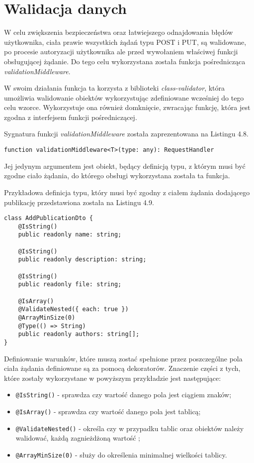 \documentclass[a4paper,12pt,twoside,openany]{report}
\begin{document}
\section{Walidacja danych}
W celu zwiększenia bezpieczeństwa oraz łatwiejszego odnajdowania błędów użytkownika, ciała prawie wszystkich żądań typu POST i PUT, są walidowane, po procesie autoryzacji użytkownika ale przed wywołaniem właściwej funkcji obsługującej żądanie. Do tego celu wykorzystana została funkcja pośrednicząca \textit{validationMiddleware}. 

W swoim działania funkcja ta korzysta z biblioteki \textit{class-validator}, która umożliwia walidowanie obiektów wykorzystując zdefiniowane wcześniej do tego celu wzorce. Wykorzystuje ona również domknięcie, zwracając funkcję, która jest zgodna z interfejsem funkcji pośredniczącej.

Sygnatura funkcji \textit{validationMiddleware} została zaprezentowana na Listingu 4.8. 

\begin{lstlisting}[caption=Sygnatura funkcji validationMiddleware,label=code1,captionpos=b]
function validationMiddleware<T>(type: any): RequestHandler
\end{lstlisting}
Jej jedynym argumentem jest obiekt, będący definicją typu, z którym musi być zgodne ciało żądania, do którego obsługi wykorzystana została ta funkcja.

Przykładowa definicja typu, który musi być zgodny z ciałem żądania dodającego publikację przedstawiona została na Listingu 4.9.
\begin{lstlisting}[caption=Klasa AddPublicationDto,label=code1,captionpos=b]
class AddPublicationDto {
	@IsString()
	public readonly name: string;
	
	@IsString()
	public readonly description: string;
	
	@IsString()
	public readonly file: string;
	
	@IsArray()
	@ValidateNested({ each: true })
	@ArrayMinSize(0)
	@Type(() => String)        
	public readonly authors: string[];
}
\end{lstlisting} 
\pagebreak

Definiowanie warunków, które muszą zostać spełnione przez poszczególne pola ciała żądania definiowane są za pomocą dekoratorów. Znaczenie części z tych, które zostały wykorzystane w powyższym przykładzie jest następujące: 
\begin{itemize}
	\item \verb|@IsString()| - sprawdza czy wartość danego pola jest ciągiem znaków;
	\item \verb|@IsArray()| - sprawdza czy wartość danego pola jest tablicą; 
	\item \verb|@ValidateNested()| - określa czy w przypadku tablic oraz obiektów należy walidować, każdą zagnieżdżoną wartość ;
	\item \verb|@ArrayMinSize(0)| - służy do określenia minimalnej wielkości tablicy.
\end{itemize}
\end{document}
